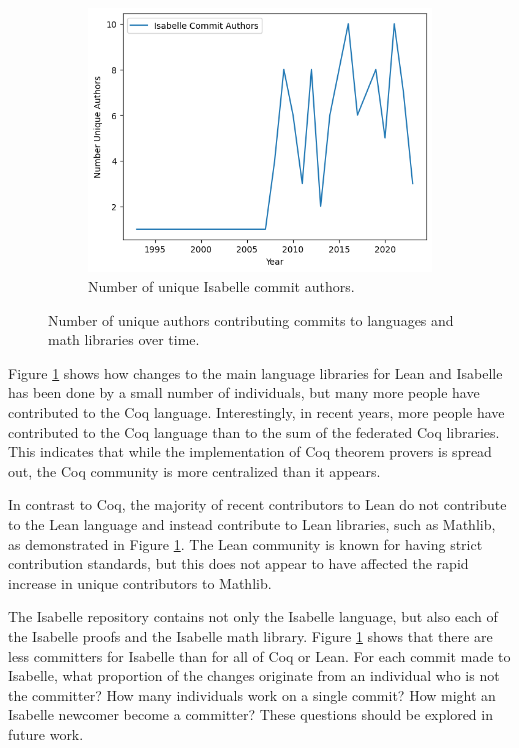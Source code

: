 \documentclass[sigconf,nonacm]{acmart}
\begin{document}
\begin{figure}[H]
\begin{subfigure}{\columnwidth}
    \includegraphics[scale=0.5]{isabelle_commit_authors.png}
    \caption{Number of unique Isabelle commit authors.}
  \end{subfigure}
  \caption{Number of unique authors contributing commits to languages and math libraries over time.}
  \label{Commit authors}
\end{figure}

Figure \ref{Commit authors} shows how changes to the main language libraries for Lean and Isabelle has been done by a small number of individuals, but many more people have contributed to the Coq language. Interestingly, in recent years, more people have contributed to the Coq language than to the sum of the federated Coq libraries. This indicates that while the implementation of Coq theorem provers is spread out, the Coq community is more centralized than it appears.

In contrast to Coq, the majority of recent contributors to Lean do not contribute to the Lean language and instead contribute to Lean libraries, such as Mathlib, as demonstrated in Figure \ref{Commit authors}. The Lean community is known for having strict contribution standards, but this does not appear to have affected the rapid increase in unique contributors to Mathlib.

The Isabelle repository contains not only the Isabelle language, but also each of the Isabelle proofs and the Isabelle math library. Figure \ref{Commit authors} shows that there are less committers for Isabelle than for all of Coq or Lean. For each commit made to Isabelle, what proportion of the changes originate from an individual who is not the committer? How many individuals work on a single commit? How might an Isabelle newcomer become a committer? These questions should be explored in future work.
\end{document}

